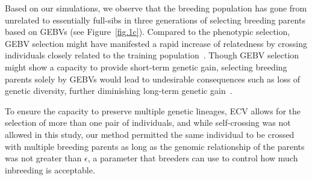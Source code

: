 \documentclass[12pt, a4paper, bibliography=totoc]{scrartcl}
\newcommand{\bb}[1]{{\color{purple} #1}}
\begin{document}


Based on our simulations, we observe that the breeding population has gone from unrelated to essentially full-sibs in three generations of selecting breeding parents based on GEBVs (see Figure~\ref{fig.1c}). Compared to the phenotypic selection, GEBV selection might have manifested a rapid increase of relatedness by crossing individuals closely related to the training population~\citep{bassi2016breeding, forutan2018inbreeding}. Though GEBV selection might show a capacity to provide short-term genetic gain, selecting breeding parents solely by GEBVs would lead to undesirable consequences such as loss of genetic diversity, further diminishing long-term genetic gain~\citep{jannink2010dynamics, doekes2018trends}. 

To ensure the capacity to preserve multiple genetic lineages, ECV allows for the selection of more than one pair of individuals, and while self-crossing was not allowed in this study, our method permitted the same individual to be crossed with multiple breeding parents as long as the genomic relationship of the parents was not greater than $\epsilon$, a parameter that breeders can use to control how much inbreeding is acceptable. 
\end{document}
